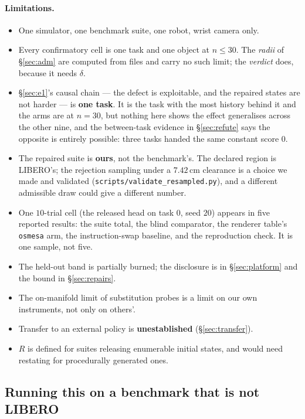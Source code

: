 \documentclass[10pt,twocolumn]{article}
\begin{document}
\paragraph{Limitations.}
\begin{itemize}\itemsep1pt \parskip0pt 
\item One simulator, one benchmark suite, one robot, wrist camera only.
\item Every confirmatory cell is one task and one object at $n \le 30$.
The \emph{radii} of \S\ref{sec:adm} are computed from files and carry no such
limit; the \emph{verdict} does, because it needs $\delta$.
\item \S\ref{sec:e1}'s causal chain --- the defect is exploitable, and the
repaired states are not harder --- is \textbf{one task}. It is the task with
the most history behind it and the arms are at $n{=}30$, but nothing here shows
the effect generalises across the other nine, and the between-task evidence in
\S\ref{sec:refute} says the opposite is entirely possible: three tasks handed
the same constant score $0$.
\item The repaired suite is \textbf{ours}, not the benchmark's. The declared
region is LIBERO's; the rejection sampling under a $7.42$\,cm clearance is a
choice we made and validated
(\texttt{scripts/validate\_resampled.py}), and a different admissible draw
could give a different number.
\item One $10$-trial cell (the released head on task $0$, seed $20$) appears in
five reported results: the suite total, the blind comparator, the renderer
table's \texttt{osmesa} arm, the instruction-swap baseline, and the
reproduction check. It is one sample, not five.
\item The held-out band is partially burned; the disclosure is in
\S\ref{sec:platform} and the bound in \S\ref{sec:repairs}.
\item The on-manifold limit of substitution probes is a limit on our own
instruments, not only on others'.
\item Transfer to an external policy is \textbf{unestablished}
(\S\ref{sec:transfer}).
\item $R$ is defined for suites releasing enumerable initial
states, and would need restating for procedurally generated ones.
\end{itemize}


\subsection{Running this on a benchmark that is not LIBERO}
\label{sec:portable}
\end{document}
